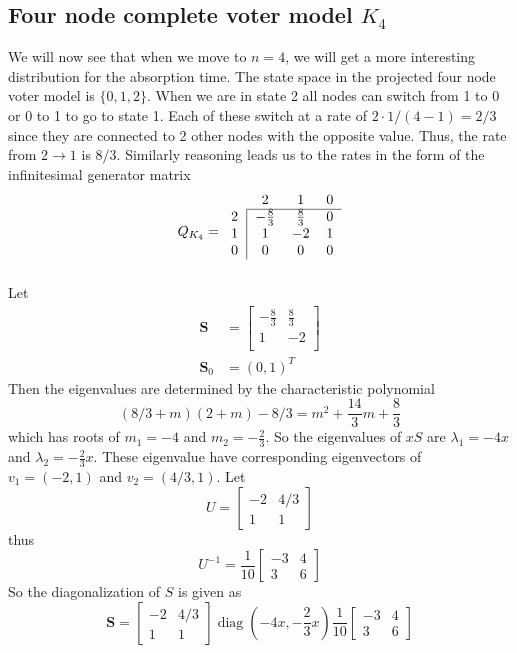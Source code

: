 \subsection{Four node complete voter model \texorpdfstring{$K_4$}{VK4}}
We will now see that when we move to $n = 4$, we will get a more interesting distribution for the absorption time.
The state space in the projected four node voter model is $\{0,1,2\}$.
When we are in state 2 all nodes can switch from 1 to 0 or 0 to 1 to go to state 1.
Each of these switch at a rate of $2 \cdot 1/(4 - 1) = 2/3$ since they are connected to 2 other nodes with the opposite value.
Thus, the rate from $2 \to 1$ is $8/3$.
Similarly reasoning leads us to the rates in the form of the infinitesimal generator matrix
$$
Q_{K_4} = \begin{blockarray}{cccc}
    & 2 & 1 & 0\\
    \begin{block}{c|ccc}
        \cline{2-4}
        2 & -\frac{8}{3} & \frac{8}{3} & 0 \\
        1 & 1 & -2 & 1\\
        0 & 0 & 0 & 0\\
    \end{block}
\end{blockarray}
$$
Let
\begin{align*}
    \mathbf{S} &= \begin{bmatrix}
    -\frac{8}{3} & \frac{8}{3}\\
    1 & -2\\
    \end{bmatrix}\\
    \mathbf{S}_0 &= (0, 1)^T
\end{align*}
Then the eigenvalues are determined by the characteristic polynomial
$$
(8/3 + m)(2 + m) - 8/3 = m^2 + \frac{14}{3} m + \frac{8}{3}
$$
which has roots of $m_1 = -4$ and $m_2 = - \frac{2}{3}$.
So the eigenvalues of $xS$ are $\lambda_1 = -4x$ and $\lambda_2 =  - \frac{2}{3} x$.
These eigenvalue have corresponding eigenvectors of $v_1 = (-2, 1)$ and $v_2 = (4/3, 1)$.
Let
$$
U = \begin{bmatrix}
    -2 & 4/3\\
    1 & 1
\end{bmatrix}
$$
thus
$$
U^{-1} = \frac{1}{10} \begin{bmatrix}
    -3 & 4\\
    3 & 6
\end{bmatrix}
$$
So the diagonalization of $S$ is given as
$$
\mathbf{S} = \begin{bmatrix}
    -2 & 4/3\\
    1 & 1
\end{bmatrix} \operatorname{diag}(-4x, - \frac{2}{3} x)
\frac{1}{10} \begin{bmatrix}
    -3 & 4\\
    3 & 6
\end{bmatrix}
$$
